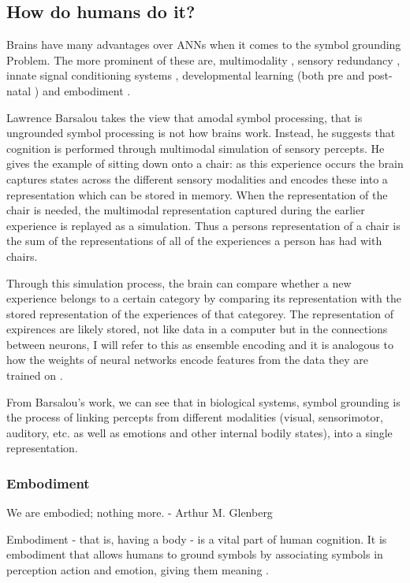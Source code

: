\subsection{How do humans do it?}
Brains have many advantages over ANNs when it comes to the symbol grounding Problem. The more prominent of these are, multimodality \cite{barsalou2008grounded}, sensory redundancy \cite{slater1999intermodal}, innate signal conditioning systems \cite{masland2012neuronal, fantz1963pattern, johnson2015two}, developmental learning (both pre \cite{webb2015mother, reid2017human} and post-natal \cite{johnson2015two}) and embodiment \cite{pfeifer2006body, smith2005development}.

Lawrence Barsalou \cite{barsalou2008grounded} takes the view that amodal symbol processing, that is ungrounded symbol processing is not how brains work. Instead, he suggests that cognition is performed through multimodal simulation of sensory percepts. He gives the example of sitting down onto a chair: as this experience occurs the brain captures states across the different sensory modalities and encodes these into a representation which can be stored in memory. When the representation of the chair is needed, the multimodal representation captured during the earlier experience is replayed as a simulation. Thus a persons representation of a chair is the sum of the representations of all of the experiences a person has had with chairs. 

Through this simulation process, the brain can compare whether a new experience belongs to a certain category by comparing its representation with the stored representation of the experiences of that categorey. The representation of expirences are likely stored, not like data in a computer but in the connections between neurons, I will refer to this as ensemble encoding \cite{nicolelis1995sensorimotor} and it is analogous to how the weights of neural networks encode features from the data they are trained on \cite{mordvintsev2015inceptionism}.


From Barsalou's work, we can see that in biological systems, symbol grounding is the process of linking percepts from different modalities (visual, sensorimotor, auditory, etc. as well as emotions and other internal bodily states), into a single representation. 

\subsubsection{Embodiment}
\begin{displayquote}
We are embodied; nothing more. - Arthur M. Glenberg
\end{displayquote}
Embodiment - that is, having a body - is a vital part of human cognition. It is embodiment that allows humans to ground symbols by associating symbols in perception action and emotion, giving them meaning \cite{glenberg2015few}.

